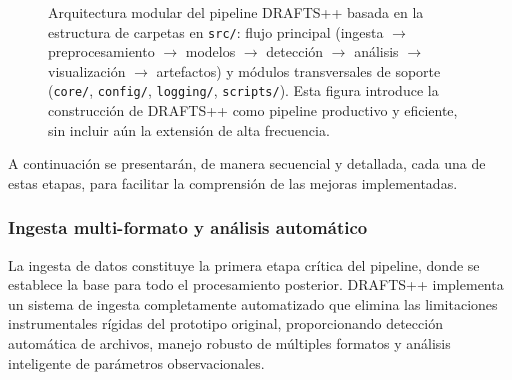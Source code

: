 \begin{figure}[H]
{}
\endgroup
\caption{Arquitectura modular del pipeline DRAFTS++ basada en la estructura de carpetas en \texttt{src/}: flujo principal (ingesta $\to$ preprocesamiento $\to$ modelos $\to$ detección $\to$ análisis $\to$ visualización $\to$ artefactos) y módulos transversales de soporte (\texttt{core/}, \texttt{config/}, \texttt{logging/}, \texttt{scripts/}). Esta figura introduce la construcción de DRAFTS++ como pipeline productivo y eficiente, sin incluir aún la extensión de alta frecuencia.}
\label{fig:workflow-src}
\end{figure}


A continuación se presentarán, de manera secuencial y detallada, cada una de estas etapas, para facilitar la comprensión de las mejoras implementadas.

\subsubsection{Ingesta multi-formato y análisis automático}

La ingesta de datos constituye la primera etapa crítica del pipeline, donde se establece la base para todo el procesamiento posterior. DRAFTS++ implementa un sistema de ingesta completamente automatizado que elimina las limitaciones instrumentales rígidas del prototipo original, proporcionando detección automática de archivos, manejo robusto de múltiples formatos y análisis inteligente de parámetros observacionales.

